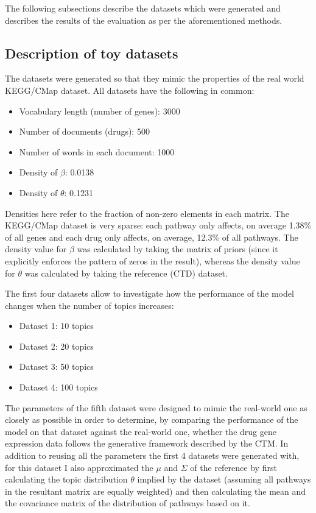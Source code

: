 \documentclass[12pt,a4paper,twoside,openright]{report}
\begin{document}
The following subsections describe the datasets which were generated and describes the results of the evaluation as per the aforementioned methods.

\subsection{Description of toy datasets}

The datasets were generated so that they mimic the properties of the real world KEGG/CMap dataset. All datasets have the following in common:

\begin{itemize}[noitemsep]
\item Vocabulary length (number of genes): 3000
\item Number of documents (drugs): 500
\item Number of words in each document: 1000
\item Density of $\beta$: 0.0138
\item Density of $\theta$: 0.1231
\end{itemize}

Densities here refer to the fraction of non-zero elements in each matrix. The KEGG/CMap dataset is very sparse: each pathway only affects, on average 1.38\% of all genes and each drug only affects, on average, 12.3\% of all pathways. The density value for $\beta$ was calculated by taking the matrix of priors (since it explicitly enforces the pattern of zeros in the result), whereas the density value for $\theta$ was calculated by taking the reference (CTD) dataset.

The first four datasets allow to investigate how the performance of the model changes when the number of topics increases:

\begin{itemize}[noitemsep]
\item Dataset 1: 10 topics
\item Dataset 2: 20 topics
\item Dataset 3: 50 topics
\item Dataset 4: 100 topics
\end{itemize}

The parameters of the fifth dataset were designed to mimic the real-world one as closely as possible in order to determine, by comparing the performance of the model on that dataset against the real-world one, whether the drug gene expression data follows the generative framework described by the CTM. In addition to reusing all the parameters the first 4 datasets were generated with, for this dataset I also approximated the $\mu$ and $\Sigma$ of the reference by first calculating the topic distribution $\theta$ implied by the dataset (assuming all pathways in the resultant matrix are equally weighted) and then calculating the mean and the covariance matrix of the distribution of pathways based on it.
\end{document}
